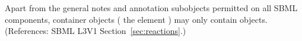 Apart from the general notes and annotation subobjects permitted on all
SBML components, \ListOfModifierSpeciesReferences container objects (\ie
the \Reaction element ) may only contain
\ModifierSpeciesReference objects.  (References: SBML L3V1
Section~\ref{sec:reactions}.)
